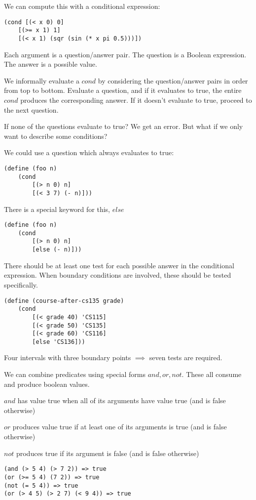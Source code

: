 \documentclass{article}
\begin{document}
We can compute this with a conditional expression:

\begin{lstlisting}
(cond [(< x 0) 0]
    [(>= x 1) 1]
    [(< x 1) (sqr (sin (* x pi 0.5)))])
\end{lstlisting}

Each argument is a question/answer pair. The question is a Boolean expression. The answer is a possible value. 

We informally evaluate a $cond$ by considering the question/answer pairs in order from top to bottom. Evaluate a question, and if it evaluates to true, the entire $cond$ produces the corresponding answer. If it doesn't evaluate to true, proceed to the next question. 

If none of the questions evaluate to true? We get an error. But what if we only want to describe some conditions?

We could use a question which always evaluates to true:

\begin{lstlisting}
(define (foo n)
    (cond
        [(> n 0) n]
        [(< 3 7) (- n)]))
\end{lstlisting}

There is a special keyword for this, $else$
\begin{lstlisting}
(define (foo n)
    (cond
        [(> n 0) n]
        [else (- n)]))
\end{lstlisting}

There should be at least one test for each possible answer in the conditional expression. When boundary conditions are involved, these should be tested specifically.

\begin{lstlisting}
(define (course-after-cs135 grade)
    (cond 
        [(< grade 40) 'CS115]
        [(< grade 50) 'CS135]
        [(< grade 60) 'CS116]
        [else 'CS136]))
\end{lstlisting}

Four intervals with three boundary points $\implies$ seven tests are required. 


We can combine predicates using special forms $and, or, not$. These all consume and produce boolean values. 

$and$ has value true when all of its arguments have value true (and is false otherwise)

$or$ produces value true if at least one of its arguments is true (and is false otherwise)

$not$ produces true if its argument is false (and is false otherwise)
\begin{lstlisting}
(and (> 5 4) (> 7 2)) => true
(or (>= 5 4) (7 2)) => true
(not (= 5 4)) => true
(or (> 4 5) (> 2 7) (< 9 4)) => true
\end{lstlisting}
\end{document}
